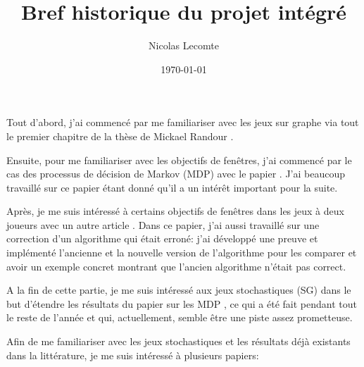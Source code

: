 \documentclass{article}
\title{Bref historique du projet intégré}
\author{Nicolas Lecomte}
\date{\today}
\theoremstyle{plain}
\begin{document}
\maketitle

Tout d'abord, j'ai commencé par me familiariser avec les jeux sur graphe via tout le premier chapitre de la thèse de Mickael Randour \cite{memoireMickael}.

Ensuite, pour me familiariser avec les objectifs de fenêtres, j'ai commencé par le cas des processus de décision de Markov (MDP) avec le papier \cite{LifeIsRandom}.
J'ai beaucoup travaillé sur ce papier étant donné qu'il a un intérêt important pour la suite.

Après, je me suis intéressé à certains objectifs de fenêtres dans les jeux à deux joueurs avec un autre article \cite{LookingAtMPAndTP}. Dans ce papier, j'ai aussi travaillé sur une correction d'un algorithme qui était erroné: j'ai développé une preuve et implémenté l'ancienne et la nouvelle version de l'algorithme pour les comparer et avoir un exemple concret montrant que l'ancien algorithme n'était pas correct.

A la fin de cette partie, je me suis intéressé aux jeux stochastiques (SG) dans le but d'étendre les résultats du papier sur les MDP \cite{LifeIsRandom}, ce qui a été fait pendant tout le reste de l'année et qui, actuellement, semble être une piste assez prometteuse.

Afin de me familiariser avec les jeux stochastiques et les résultats déjà existants dans la littérature, je me suis intéressé à plusieurs papiers:
\end{document}
